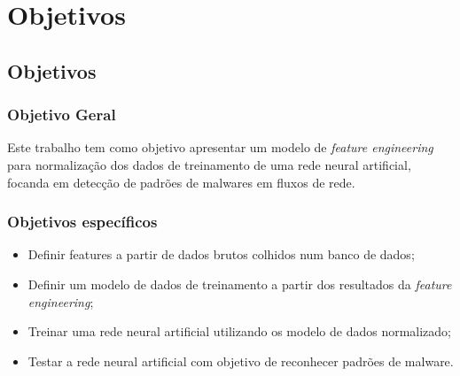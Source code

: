 \part{Objetivos}
\chapter[Objetivos]{Objetivos}

\section{Objetivo Geral}
    Este trabalho tem como objetivo apresentar um modelo de \textit{feature engineering} para normalização dos dados de treinamento de uma rede neural artificial, focanda em detecção de padrões de malwares em fluxos de rede.


\section{Objetivos específicos}
    \begin{itemize}
        \item Definir features a partir de dados brutos colhidos num banco de dados;
        \item Definir um modelo de dados de treinamento a partir dos resultados da \textit{feature engineering};
        \item Treinar uma rede neural artificial utilizando os modelo de dados normalizado;
        \item Testar a rede neural artificial com objetivo de reconhecer padrões de malware.
    \end{itemize}